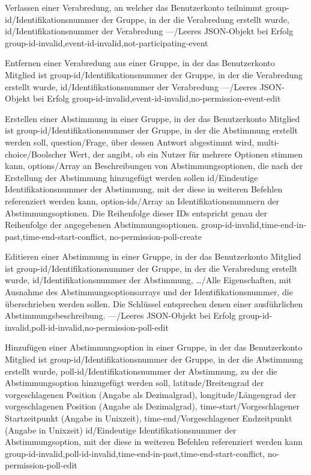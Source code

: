 \documentclass[parskip=full,11pt]{scrartcl}
\begin{document}
{Verlassen einer Verabredung, an welcher das Benutzerkonto teilnimmt}
{group-id/Identifikationsnummer der Gruppe{,} in der die Verabredung erstellt
wurde,
id/Identifikationsnummer der Verabredung}
{---/Leeres JSON-Objekt bei Erfolg}
{group-id-invalid,event-id-invalid,not-participating-event}

{Entfernen einer Verabredung aus einer Gruppe, in der das Benutzerkonto
Mitglied ist}
{group-id/Identifikationsnummer der Gruppe{,} in der die Verabredung erstellt
wurde,
id/Identifikationsnummer der Verabredung}
{---/Leeres JSON-Objekt bei Erfolg}
{group-id-invalid,event-id-invalid,no-permission-event-edit}

{Erstellen einer Abstimmung in einer Gruppe, in der das Benutzerkonto Mitglied
ist}
{group-id/Identifikationsnummer der Gruppe{,} in der die Abstimmung erstellt
werden soll,
question/Frage{,} über dessen Antwort abgestimmt wird,
multi-choice/Boolscher Wert{,} der angibt{,} ob ein Nutzer für mehrere
Optionen stimmen kann,
options/Array an Beschreibungen von Abstimmungsoptionen{,} die nach der
Erstellung der Abstimmung hinzugefügt werden sollen}
{id/Eindeutige Identifikationsnummer der Abstimmung{,} mit der diese in
weiteren Befehlen referenziert werden kann,
option-ids/Array an Identifikationsnummern der Abstimmungsoptionen. Die
Reihenfolge dieser IDs entspricht genau der Reihenfolge der angegebenen
Abstimmungsoptionen.}
{group-id-invalid,time-end-in-past,time-end-start-conflict,
no-permission-poll-create}

{Editieren einer Abstimmung in einer Gruppe, in der das Benutzerkonto Mitglied
ist}
{group-id/Identifikationsnummer der Gruppe{,} in der die Verabredung erstellt
wurde,
id/Identifikationsnummer der Abstimmung,
\dots/Alle Eigenschaften{,} mit Ausnahme des Abstimmungsoptionsarrays und der
Identifikationsnummer{,} die überschrieben werden sollen.
Die Schlüssel entsprechen denen einer ausführlichen Abstimmungsbeschreibung.}
{---/Leeres JSON-Objekt bei Erfolg}
{group-id-invalid,poll-id-invalid,no-permission-poll-edit}

{Hinzufügen einer Abstimmungsoption in einer Gruppe, in der das Benutzerkonto
Mitglied ist}
{group-id/Identifikationsnummer der Gruppe{,} in der die Abstimmung erstellt
wurde,
poll-id/Identifikationsnummer der Abstimmung{,} zu der die Abstimmungsoption
hinzugefügt werden soll,
latitude/Breitengrad der vorgeschlagenen Position (Angabe als Dezimalgrad),
longitude/Längengrad der vorgeschlagenen Position (Angabe als Dezimalgrad),
time-start/Vorgeschlagener Startzeitpunkt (Angabe in Unixzeit),
time-end/Vorgeschlagener Endzeitpunkt (Angabe in Unixzeit)}
{id/Eindeutige Identifikationsnummer der Abstimmungsoption{,} mit der diese in
weiteren Befehlen referenziert werden kann}
{group-id-invalid,poll-id-invalid,time-end-in-past,time-end-start-conflict,
no-permission-poll-edit}
\end{document}
